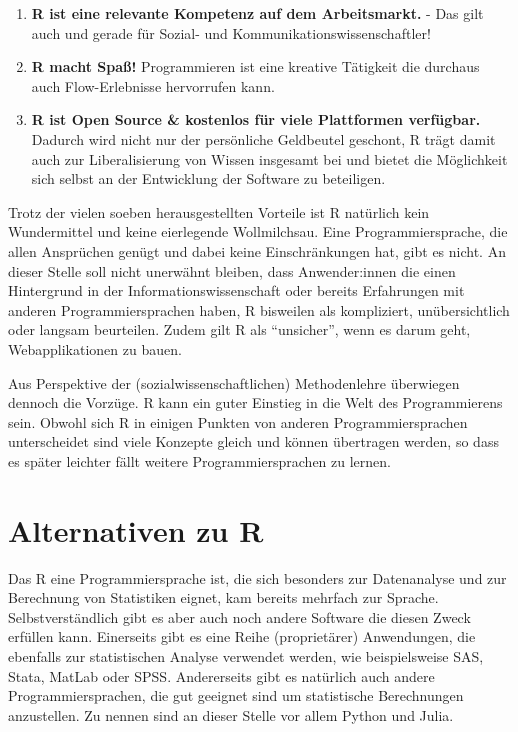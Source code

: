 \documentclass[
]{book}
\begin{document}
\begin{enumerate}
\item
  \textbf{R ist eine relevante Kompetenz auf dem Arbeitsmarkt.} - Das gilt auch und gerade für Sozial- und Kommunikationswissenschaftler!
\item
  \textbf{R macht Spaß!} Programmieren ist eine kreative Tätigkeit die durchaus auch Flow-Erlebnisse hervorrufen kann.
\item
  \textbf{R ist Open Source \& kostenlos für viele Plattformen verfügbar.} Dadurch wird nicht nur der persönliche Geldbeutel geschont, R trägt damit auch zur Liberalisierung von Wissen insgesamt bei und bietet die Möglichkeit sich selbst an der Entwicklung der Software zu beteiligen.
\end{enumerate}

Trotz der vielen soeben herausgestellten Vorteile ist R natürlich kein Wundermittel und keine eierlegende Wollmilchsau. Eine Programmiersprache, die allen Ansprüchen genügt und dabei keine Einschränkungen hat, gibt es nicht. An dieser Stelle soll nicht unerwähnt bleiben, dass Anwender:innen die einen Hintergrund in der Informationswissenschaft oder bereits Erfahrungen mit anderen Programmiersprachen haben, R bisweilen als kompliziert, unübersichtlich oder langsam beurteilen. Zudem gilt R als ``unsicher'', wenn es darum geht, Webapplikationen zu bauen.

Aus Perspektive der (sozialwissenschaftlichen) Methodenlehre überwiegen dennoch die Vorzüge.
R kann ein guter Einstieg in die Welt des Programmierens sein. Obwohl sich R in einigen Punkten von anderen Programmiersprachen unterscheidet sind viele Konzepte gleich und können übertragen werden, so dass es später leichter fällt weitere Programmiersprachen zu lernen.

\hypertarget{alternativen-zu-r}{%
\section{Alternativen zu R}\label{alternativen-zu-r}}

Das R eine Programmiersprache ist, die sich besonders zur Datenanalyse und zur Berechnung von
Statistiken eignet, kam bereits mehrfach zur Sprache. Selbstverständlich gibt es aber auch noch
andere Software die diesen Zweck erfüllen kann.
Einerseits gibt es eine Reihe (proprietärer) Anwendungen, die ebenfalls zur statistischen Analyse verwendet werden, wie beispielsweise SAS, Stata, MatLab oder SPSS.
Andererseits gibt es natürlich auch andere Programmiersprachen, die gut geeignet sind um statistische
Berechnungen anzustellen.
Zu nennen sind an dieser Stelle vor allem Python und Julia.
\end{document}
